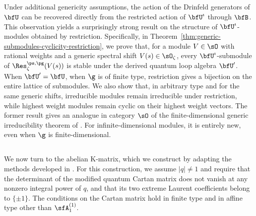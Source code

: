 \documentclass[reqno]{amsart}
\numberwithin{equation}{section}
\begin{document}
\subsection{}
Under additional genericity assumptions, the action of the Drinfeld generators of 
$\bfU$ can be recovered directly from the restricted action of $\bfU^\imath$ through 
$\bfB$. This observation yields a surprisingly strong result on the structure of 
$\bfU^\imath$-modules obtained by restriction. Specifically, in 
Theorem~\ref{thm:generic-submodules-cyclicity-restriction}, we prove that, for a
module $V\in\sO$ with rational weights and a generic spectral shift
$V(s)\in\sO_\zeta$, every $\bfU^\imath$-submodule of
$\Res_{\zeta}^{\ps,\pg}(V(s))$ is stable under the derived quantum loop algebra 
$\bfU'$. When $\bfU'=\bfU$, \eg when $\g$ is of finite type, restriction 
gives a bijection on the entire lattice of submodules.
We also show that, in arbitrary type and for the same generic shifts, 
irreducible modules remain irreducible under restriction, while highest weight modules 
remain cyclic on their highest weight vectors.
The former result gives an analogue in category $\sO$ of the finite-dimensional generic 
irreducibility theorem of \cite{appel-vlaar-25a}. 
For infinite-dimensional modules, it is entirely new, even when $\g$ is finite-dimensional.

\subsection{}
We now turn to the abelian K-matrix, which we construct by adapting the methods 
developed in \cite{appel-gautam-26}.
For this construction, we assume $|q|\neq1$ and require that the determinant of the 
modified quantum Cartan matrix does not vanish at any nonzero integral power of 
$q$, and that its two extreme Laurent coefficients belong to $\{\pm1\}$.
The conditions on the Cartan matrix hold in finite type and in affine type other than 
$\sfA_1^{(1)}$.
\end{document}
